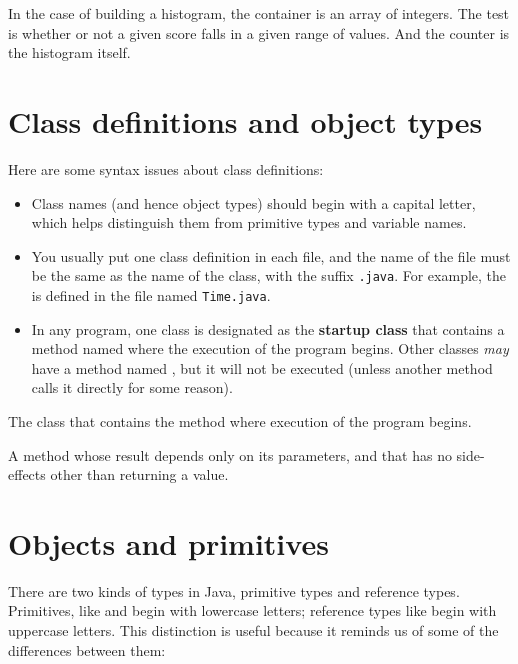 In the case of building a histogram, the container is an array of integers.
The test is whether or not a given score falls in a given range of values.
And the counter is the histogram itself.


\section{Class definitions and object types}

Here are some syntax issues about class definitions:

\begin{itemize}

\item Class names (and hence object types) should begin with a capital letter, which helps distinguish them from primitive types and variable names.

\item You usually put one class definition in each file, and the name of the file must be the same as the name of the class, with the suffix {\tt .java}.
For example, the  is defined in the file named {\tt Time.java}.

\item In any program, one class is designated as the {\bf startup class} that contains a method named  where the execution of the program begins.
Other classes {\em may} have a method named , but it will not be executed (unless another method calls it directly for some reason).

\end{itemize}

The class that contains the  method where execution of the program begins.

A method whose result depends only on its parameters, and that has no side-effects other than returning a value.


\section{Objects and primitives}


There are two kinds of types in Java, primitive types and reference types.
Primitives, like  and  begin with lowercase letters; reference types like  begin with uppercase letters.
This distinction is useful because it reminds us of some of the differences between them:

